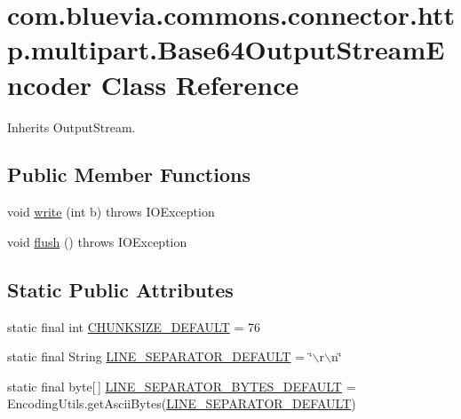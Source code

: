 \hypertarget{classcom_1_1bluevia_1_1commons_1_1connector_1_1http_1_1multipart_1_1Base64OutputStreamEncoder}{
\section{com.bluevia.commons.connector.http.multipart.Base64OutputStreamEncoder Class Reference}
\label{classcom_1_1bluevia_1_1commons_1_1connector_1_1http_1_1multipart_1_1Base64OutputStreamEncoder}
}


Inherits OutputStream.

\subsection*{Public Member Functions}
\begin{DoxyCompactItemize}
\item 
void \hyperlink{classcom_1_1bluevia_1_1commons_1_1connector_1_1http_1_1multipart_1_1Base64OutputStreamEncoder_a6e9151f9ad39a429992d74940200ff3b}{write} (int b)  throws IOException 
\item 
void \hyperlink{classcom_1_1bluevia_1_1commons_1_1connector_1_1http_1_1multipart_1_1Base64OutputStreamEncoder_a7fc704a930fbe994f825094ca8a6347c}{flush} ()  throws IOException 
\end{DoxyCompactItemize}
\subsection*{Static Public Attributes}
\begin{DoxyCompactItemize}
\item 
static final int \hyperlink{classcom_1_1bluevia_1_1commons_1_1connector_1_1http_1_1multipart_1_1Base64OutputStreamEncoder_ac3843a2f83f242e73f0bc10263260213}{CHUNKSIZE\_\-DEFAULT} = 76
\item 
static final String \hyperlink{classcom_1_1bluevia_1_1commons_1_1connector_1_1http_1_1multipart_1_1Base64OutputStreamEncoder_ac7ff94c6398398174d06a7c21f0ebf15}{LINE\_\-SEPARATOR\_\-DEFAULT} = \char`\"{}$\backslash$r$\backslash$n\char`\"{}
\item 
static final byte\mbox{[}$\,$\mbox{]} \hyperlink{classcom_1_1bluevia_1_1commons_1_1connector_1_1http_1_1multipart_1_1Base64OutputStreamEncoder_ad4a7af84e77b356c32074b334a1ad277}{LINE\_\-SEPARATOR\_\-BYTES\_\-DEFAULT} = EncodingUtils.getAsciiBytes(\hyperlink{classcom_1_1bluevia_1_1commons_1_1connector_1_1http_1_1multipart_1_1Base64OutputStreamEncoder_ac7ff94c6398398174d06a7c21f0ebf15}{LINE\_\-SEPARATOR\_\-DEFAULT})
\end{DoxyCompactItemize}
